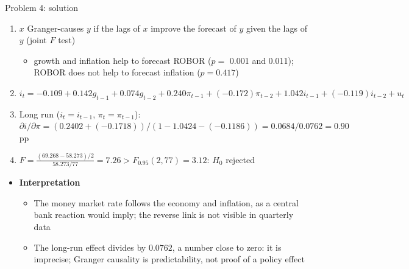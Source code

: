 \begin{frame}{Problem 4: solution}
\itemsize{\footnotesize}
\begin{enumerate}
    \item $x$ Granger-causes $y$ if the lags of $x$ improve the forecast of $y$ given the lags of $y$ (joint $F$ test) 
\begin{itemize}
\item growth and inflation help to forecast ROBOR ($p =$ 0.001 and 0.011); ROBOR does not help to forecast inflation ($p = 0.417$)
\end{itemize}
    \item $i_t = \ensuremath{-}0.109 + 0.142g_{t-1} + 0.074g_{t-2} + 0.240\pi_{t-1} + (\ensuremath{-}0.172)\pi_{t-2} + 1.042i_{t-1} + (\ensuremath{-}0.119)i_{t-2} + u_t$
    \item Long run ($i_t = i_{t-1}$, $\pi_t = \pi_{t-1}$): $\partial i/\partial\pi = (0.2402 + (\ensuremath{-}0.1718))/(1 - 1.0424 - (\ensuremath{-}0.1186)) = 0.0684/0.0762 = 0.90$ pp
    \item $F = \frac{(69.268 - 58.273)/2}{58.273/77} = 7.26 > F_{0.95}(2, 77) = 3.12$: $H_0$ rejected
\end{enumerate}
\begin{itemize}
    \item \textbf{Interpretation}
    \begin{itemize}
        \item The money market rate follows the economy and inflation, as a central bank reaction would imply; the reverse link is not visible in quarterly data
        \item The long-run effect divides by $0.0762$, a number close to zero: it is imprecise; Granger causality is predictability, not proof of a policy effect
    \end{itemize}
\end{itemize}
\end{frame}

